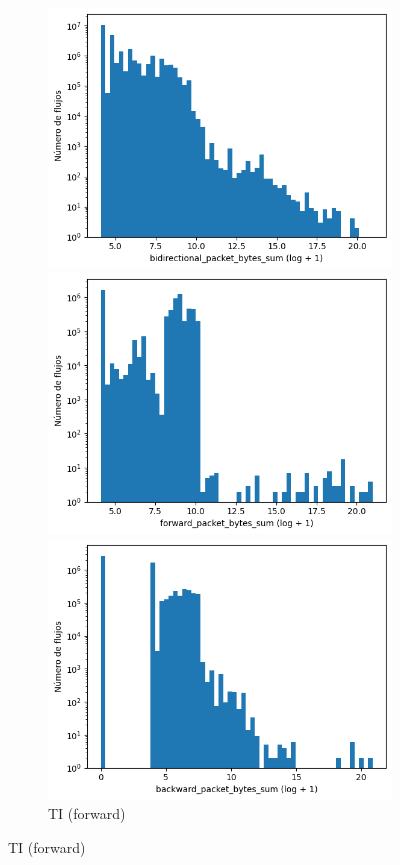 \begin{figure}[H]
\begin{subfigure}[b]{0.26\textwidth}
        \includegraphics[width=\linewidth]{media/packet_pincer_toniot/bidirectional_packet_bytes_sum_log_x_log_y.png}
        \caption{TI (bidir.)}
        \includegraphics[width=\textwidth]{media/packet_pincer_botiot/forward_packet_bytes_sum_log_x_log_y.png}
        \caption{TI (forward)}
        \includegraphics[width=\textwidth]{media/packet_pincer_botiot/backward_packet_bytes_sum_log_x_log_y.png}

\end{subfigure}
\end{figure}
